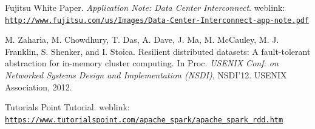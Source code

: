 \documentclass[10pt,conference,letterpaper]{IEEEtran}
\begin{document}
\begin{thebibliography}{1}
Fujitsu White Paper. \textit{Application Note: Data Center Interconnect}.
weblink: \texttt{\url{http://www.fujitsu.com/us/Images/Data-Center-Interconnect-app-note.pdf}}

M. Zaharia, M. Chowdhury, T. Das, A. Dave, J. Ma,
M. McCauley, M. J. Franklin, S. Shenker, and I. Stoica. Resilient distributed datasets: A fault-tolerant abstraction for in-memory cluster computing. In Proc. \textit{USENIX Conf. on Networked Systems Design and Implementation (NSDI)}, NSDI’12. USENIX Association, 2012.

Tutorials Point Tutorial. weblink: \texttt{\url{https://www.tutorialspoint.com/apache_spark/apache_spark_rdd.htm}}
\end{thebibliography}
\end{document}
